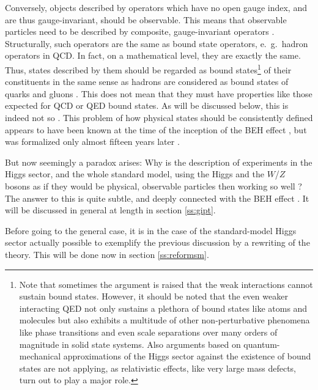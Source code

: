 \documentclass[final,12pt,3p,longtitle]{elsarticle}
\newcommand*{\1}{1\!\!\!\bot}
\begin{document}
Conversely, objects described by operators which have no open gauge index, and are thus gauge-invariant, should be observable. This means that observable particles need to be described by composite, gauge-invariant operators \cite{'tHooft:1979bj,Frohlich:1980gj,Frohlich:1981yi,Strocchi:2015uaa}. Structurally, such operators are the same as bound state operators, e.\ g.\ hadron operators in QCD. In fact, on a mathematical level, they are exactly the same. Thus, states described by them should be regarded as bound states\footnote{Note that sometimes the argument is raised that the weak interactions cannot sustain bound states. However, it should be noted that the even weaker interacting QED not only sustains a plethora of bound states like atoms and molecules but also exhibits a multitude of other non-perturbative phenomena like phase transitions and even scale separations over many orders of magnitude in solid state systems. Also arguments based on quantum-mechanical approximations of the Higgs sector against the existence of bound states \cite{Grifols:1991gw} are not applying, as relativistic effects, like very large mass defects, turn out to play a major role.} of their constituents in the same sense as hadrons are considered as bound states of quarks and gluons \cite{Maas:2012tj}. This does not mean that they must have properties like those expected for QCD or QED bound states. As will be discussed below, this is indeed not so \cite{Frohlich:1980gj,Frohlich:1981yi,Maas:2012tj}. This problem of how physical states should be consistently defined appears to have been known at the time of the inception of the BEH effect \cite{Ivanov:pc,Strocchi:1977za,Englert:2004yk,Englert:2014zpa}, but was formalized only almost fifteen years later \cite{'tHooft:1979bj,Banks:1979fi,Frohlich:1980gj}.

But now seemingly a paradox arises: Why is the description of experiments in the Higgs sector, and the whole standard model, using the Higgs and the $W$/$Z$ bosons as if they would be physical, observable particles then working so well \cite{Bohm:2001yx,pdg,Djouadi:2005gi}? The answer to this is quite subtle, and deeply connected with the BEH effect \cite{Frohlich:1980gj,Frohlich:1981yi}. It will be discussed in general at length in section \ref{ss:gipt}.

Before going to the general case, it is in the case of the standard-model Higgs sector actually possible to exemplify the previous discussion by a rewriting of the theory. This will be done now in section \ref{ss:reformsm}.
\end{document}
